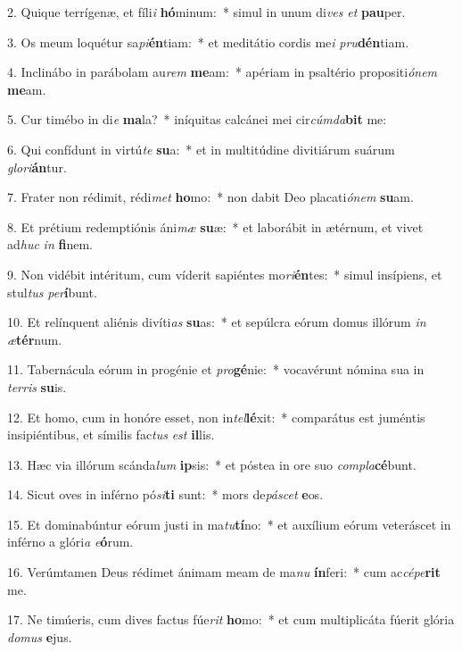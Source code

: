 2. Quique terrígenæ, et fíli\textit{i} \textbf{hó}minum:~*  simul in unum di\textit{ves} \textit{et} \textbf{pau}per.\

3. Os meum loquétur sa\textit{pi}\textbf{én}tiam:~*  et meditátio cordis me\textit{i} \textit{pru}\textbf{dén}tiam.\

4. Inclinábo in parábolam au\textit{rem} \textbf{me}am:~*  apériam in psaltério propositi\textit{ó}\textit{nem} \textbf{me}am.\

5. Cur timébo in di\textit{e} \textbf{ma}la?~*  iníquitas calcánei mei cir\textit{cúm}\textit{da}\textbf{bit} me:\

6. Qui confídunt in virtú\textit{te} \textbf{su}a:~*  et in multitúdine divitiárum suárum \textit{glo}\textit{ri}\textbf{án}tur.\

7. Frater non rédimit, rédi\textit{met} \textbf{ho}mo:~*  non dabit Deo placati\textit{ó}\textit{nem} \textbf{su}am.\

8. Et prétium redemptiónis áni\textit{mæ} \textbf{su}æ:~*  et laborábit in ætérnum, et vivet ad\textit{huc} \textit{in} \textbf{fi}nem.\

9. Non vidébit intéritum, cum víderit sapiéntes mo\textit{ri}\textbf{én}tes:~*  simul insípiens, et stul\textit{tus} \textit{per}\textbf{í}bunt.\

10. Et relínquent aliénis divíti\textit{as} \textbf{su}as:~*  et sepúlcra eórum domus illórum \textit{in} \textit{æ}\textbf{tér}num.\

11. Tabernácula eórum in progénie et \textit{pro}\textbf{gé}nie:~*  vocavérunt nómina sua in \textit{ter}\textit{ris} \textbf{su}is.\

12. Et homo, cum in honóre esset, non in\textit{tel}\textbf{lé}xit:~*  comparátus est juméntis insipiéntibus, et símilis fac\textit{tus} \textit{est} \textbf{il}lis.\

13. Hæc via illórum scánda\textit{lum} \textbf{ip}sis:~*  et póstea in ore suo \textit{com}\textit{pla}\textbf{cé}bunt.\

14. Sicut oves in inférno pó\textit{si}\textbf{ti} sunt:~*  mors de\textit{pá}\textit{scet} \textbf{e}os.\

15. Et dominabúntur eórum justi in ma\textit{tu}\textbf{tí}no:~*  et auxílium eórum veteráscet in inférno a glóri\textit{a} \textit{e}\textbf{ó}rum.\

16. Verúmtamen Deus rédimet ánimam meam de ma\textit{nu} \textbf{ín}feri:~*  cum ac\textit{cé}\textit{pe}\textbf{rit} me.\

17. Ne timúeris, cum dives factus fúe\textit{rit} \textbf{ho}mo:~*  et cum multiplicáta fúerit glória \textit{do}\textit{mus} \textbf{e}jus.\

